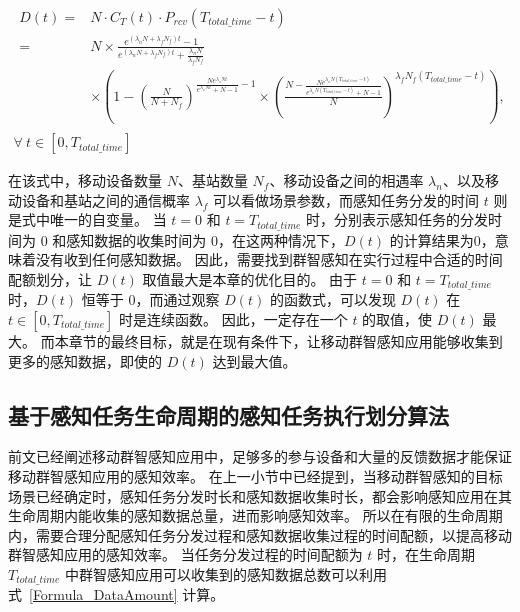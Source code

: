 \vspace{-2.5em}
\begin{equation}
  \label{Formula_DataAmount}
  \begin{gathered}
    \begin{aligned}
      D(t) = &N \cdot C_T(t) \cdot P_{rcv}(T_{total\_time}-t)\\
      = &N \times \frac{e^{(\lambda_n N + \lambda_f N_f) t} - 1}{e^{(\lambda_n N + \lambda_f N_f) t} + \frac{\lambda_n N}{\lambda_f N_f}} \\
      &\times (1 -  (\frac{N}{N + N_f})^{\frac{N e^{\lambda_n N t}}{e^{\lambda_n N t} + N -1} - 1} \times (\frac{N-\frac{N e^{\lambda_n N (T_{total\_time} - t)}}{e^{\lambda_n N (T_{total\_time} - t)} + N -1}}{N})^{\lambda_f N_f (T_{total\_time} - t)}),
    \end{aligned}\\
    \forall \ t \in [0, T_{total\_time}]
  \end{gathered}
\end{equation}

在该式中，移动设备数量 $N$、基站数量 $N_f$、移动设备之间的相遇率 $\lambda_n$、以及移动设备和基站之间的通信概率 $\lambda_f$ 可以看做场景参数，而感知任务分发的时间 $t$ 则是式中唯一的自变量。
当 $t = 0$ 和 $t = T_{total\_time}$ 时，分别表示感知任务的分发时间为 0 和感知数据的收集时间为 0，在这两种情况下，$D(t)$ 的计算结果为0，意味着没有收到任何感知数据。
因此，需要找到群智感知在实行过程中合适的时间配额划分，让 $D(t)$ 取值最大是本章的优化目的。
由于 $t = 0$ 和 $t = T_{total\_time}$ 时，$D(t)$ 恒等于 $0$，而通过观察 $D(t)$ 的函数式，可以发现 $D(t)$ 在 $ t \in [0, T_{total\_time}] $ 时是连续函数。
因此，一定存在一个 $t$ 的取值，使 $D(t)$ 最大。
而本章节的最终目标，就是在现有条件下，让移动群智感知应用能够收集到更多的感知数据，即使的 $D(t)$ 达到最大值。

\subsection{基于感知任务生命周期的感知任务执行划分算法}
\label{UIC:algo}


前文已经阐述移动群智感知应用中，足够多的参与设备和大量的反馈数据才能保证移动群智感知应用的感知效率。
在上一小节中已经提到，当移动群智感知的目标场景已经确定时，感知任务分发时长和感知数据收集时长，都会影响感知应用在其生命周期内能收集的感知数据总量，进而影响感知效率。
所以在有限的生命周期内，需要合理分配感知任务分发过程和感知数据收集过程的时间配额，以提高移动群智感知应用的感知效率。
当任务分发过程的时间配额为 $t$ 时，在生命周期 $T_{total\_time}$ 中群智感知应用可以收集到的感知数据总数可以利用式~\eqref{Formula_DataAmount} 计算。


